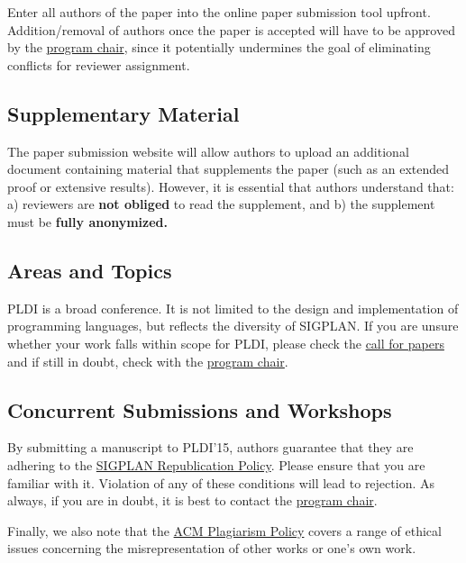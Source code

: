 \documentclass[pldi]{sigplanconf}
\begin{document}
Enter all authors of the paper into the online paper submission tool
upfront. Addition/removal of authors once the paper is accepted will
have to be approved by the \href{mailto:steve.blackburn@anu.edu.au?subject=[PLDI'15]}{program chair}, since it potentially
undermines the goal of eliminating conflicts for reviewer assignment.

\subsection{Supplementary Material}

The paper submission website will allow authors to upload an
additional document containing material that supplements the paper
(such as an extended proof or extensive results).  However, it is
essential that authors understand that: a) reviewers are \textbf{not
  obliged} to read the supplement, and b) the supplement must
  be \textbf{fully anonymized.}

\subsection{Areas and Topics}

PLDI is a broad conference.  It is not limited to the design and
implementation of programming languages, but reflects the diversity of
SIGPLAN.  If you are unsure whether your work falls
within scope for PLDI, please check the
\href{http://conf.researchr.org/track/pldi2015/pldi2015-papers#Call-for-Papers}{call
  for papers} and if still in doubt, check with the
\href{mailto:steve.blackburn@anu.edu.au?subject=[PLDI'15]}{program
  chair}.

\subsection{Concurrent Submissions and Workshops}

By submitting a manuscript to PLDI'15, authors guarantee that they
are adhering to the
\href{http://www.sigplan.org/Resources/Policies/Republication/}{SIGPLAN
  Republication Policy}. Please ensure that you are familiar with it.
Violation of any of these conditions will lead to rejection.
As always, if you are in doubt, it is best to contact the
\href{mailto:steve.blackburn@anu.edu.au?subject=[PLDI'15]}{program
  chair}.

Finally, we also note that the
\href{http://www.acm.org/publications/policies/plagiarism_policy}{ACM
  Plagiarism Policy} covers a range of ethical issues concerning the
misrepresentation of other works or one's own work.
\end{document}
